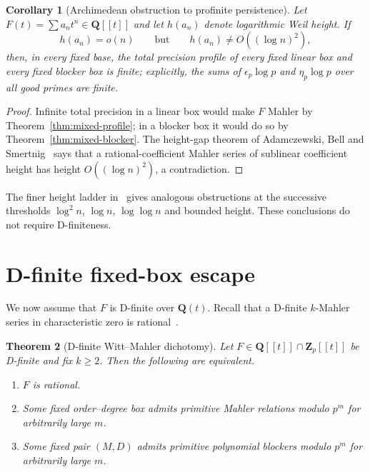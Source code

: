 \documentclass[11pt,reqno]{amsart}
\newtheorem{theorem}{Theorem}[section]
\newtheorem{corollary}[theorem]{Corollary}
\theoremstyle{definition}
\theoremstyle{remark}
\newcommand{\Q}{\mathbf Q}
\newcommand{\Zp}{\mathbf Z_p}
\begin{document}
\begin{corollary}[Archimedean obstruction to profinite persistence]
\label{cor:height-obstruction}
Let $F(t)=\sum a_nt^n\in\Q[[t]]$ and let $h(a_n)$ denote logarithmic Weil
height.  If
\[
 h(a_n)=o(n)\qquad\text{but}\qquad h(a_n)\not=O((\log n)^2),
\]
then, in every fixed base, the total precision profile of every fixed
linear box and every fixed blocker box is finite; explicitly, the sums of
$\epsilon_p\log p$ and $\eta_p\log p$ over all good primes are finite.
\end{corollary}

\begin{proof}
Infinite total precision in a linear box would make $F$ Mahler by
Theorem~\ref{thm:mixed-profile}; in a blocker box it would do so by
Theorem~\ref{thm:mixed-blocker}.  The height-gap theorem of Adamczewski,
Bell and Smertnig~\cite[Theorem~6.1]{abs} says that a rational-coefficient
Mahler series of sublinear coefficient height has height
$O((\log n)^2)$, a contradiction.
\end{proof}

The finer height ladder in~\cite{abs} gives analogous obstructions at the
successive thresholds $\log^2 n$, $\log n$, $\log\log n$ and bounded
height.  These conclusions do not require D-finiteness.

\section{D-finite fixed-box escape}

We now assume that $F$ is D-finite over $\Q(t)$.  Recall that a D-finite
$k$-Mahler series in characteristic zero is rational~\cite{bcr}.

\begin{theorem}[D-finite Witt--Mahler dichotomy]\label{thm:dfinite}
Let $F\in\Q[[t]]\cap\Zp[[t]]$ be D-finite and fix $k\geq2$.  Then the
following are equivalent.
\begin{enumerate}[label=\textup{(\roman*)}]
\item $F$ is rational.
\item Some fixed order--degree box admits primitive Mahler relations modulo
      $p^m$ for arbitrarily large $m$.
\item Some fixed pair $(M,D)$ admits primitive polynomial blockers modulo
      $p^m$ for arbitrarily large $m$.
\end{enumerate}
\end{theorem}
\end{document}
